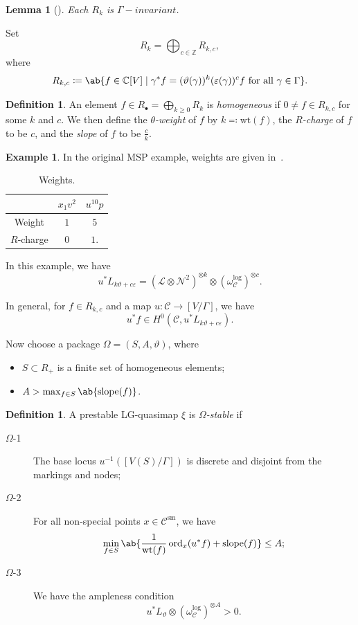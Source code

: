 \documentclass[10pt]{amsart}
\newtheorem{lem}[thm]{Lemma}
\theoremstyle{definition}
\newtheorem{defn}[thm]{Definition}
\newtheorem{exm}[thm]{Example}
\theoremstyle{remark}
\theoremstyle{plain}
\theoremstyle{definition}
\theoremstyle{remark}
\newcommand{\C}{\mathbb{C}}
\newcommand{\Z}{\mathbb{Z}}
\newcommand{\ep}{\varepsilon}
\newcommand{\mc}[1]{\mathcal{#1}}
\newcommand{\mr}[1]{\mathrm{#1}}
\newcommand{\on}[1]{\operatorname{#1}}
\newcommand{\1}{\mathbf{1}}
\newcommand{\2}{\mathbf{2}}
\newcommand{\3}{\mathbf{3}}
\begin{document}
\begin{lem}[\cite{glsm}]
    Each $R_k$ is $\Gamma-invariant$. 
\end{lem}
Set
\[ R_k = \bigoplus_{c \in \Z} R_{k,c}, \]
where
\[ R_{k,c} \coloneqq \ab\{ f \in \C[V] \mid \gamma^* f = (\vartheta(\gamma))^k (\ep(\gamma))^c f \text{ for all }\gamma \in \Gamma \}. \]

\begin{defn}
    An element $f \in R_{\bullet} = \bigoplus_{k \geq 0} R_k$ is \textit{homogeneous} if $0 \neq f \in R_{k,c}$ for some $k$ and $c$. We then define the \textit{$\theta$-weight} of $f$ by $k \eqqcolon \mr{wt}(f)$, the \textit{$R$-charge} of $f$ to be $c$, and the \textit{slope} of $f$ to be $\frac{c}{k}$.
\end{defn}

\begin{exm}
    In the original MSP example, weights are given in~.
    \begin{table}[htpb]
        \centering
        \caption{Weights.}
        \label{tab:weights}
        \begin{tabular}{ccc}
            \toprule
            & $x_1 v^2$ & $u^{10} p$ \\
            \midrule
            Weight & $1$ & $5$ \\
            $R$-charge & $0$ & $1$.\\
            \bottomrule
        \end{tabular}
    \end{table}
    In this example, we have
    \[ u^* L_{k\vartheta+c\ep} = (\mc{L} \otimes \mc{N}^2)^{\otimes k} \otimes (\omega_{\mc{C}}^{\log})^{\otimes c}. \]
\end{exm}

In general, for $f \in R_{k,c}$ and a map $u \colon \mc{C} \to [V/\Gamma]$, we have
\[ u^* f \in H^0(\mc{C}, u^*L_{k\vartheta + c\ep}). \]

Now choose a package $\Omega = (S,A,\vartheta)$, where
\begin{itemize}
    \item $S \subset R_+$ is a finite set of homogeneous elements;
    \item $A > \max_{f \in S} \ab\{\on{slope}(f) \}$.
\end{itemize}

\begin{defn}
    A prestable LG-quasimap $\xi$ is \textit{$\Omega$-stable} if
    \begin{description}
        \item[$\Omega$-1] The base locus $u^{-1}( [ V(S)/\Gamma] )$ is discrete and disjoint from the markings and nodes;
        \item[$\Omega$-2] For all non-special points $x \in \mc{C}^{\mr{sm}}$, we have
            \[ \min_{f \in S} \ab\{ \frac{1}{\mr{wt}(f)} \on{ord}_x (u^* f) + \on{slope}(f)\} \leq A; \]
        \item[$\Omega$-3] We have the ampleness condition
            \[ u^* L_{\vartheta} \otimes (\omega_{\mc{C}}^{\log})^{\otimes A} > 0. \]
    \end{description}
\end{defn}
\end{document}
